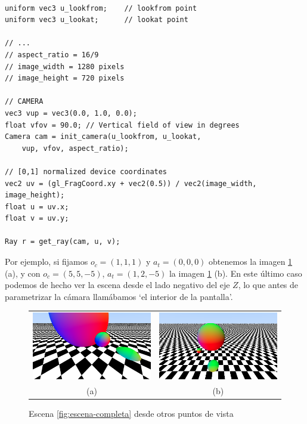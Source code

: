 \begin{lstlisting}

uniform vec3 u_lookfrom;    // lookfrom point
uniform vec3 u_lookat;      // lookat point

// ... 
// aspect_ratio = 16/9
// image_width = 1280 pixels
// image_height = 720 pixels

// CAMERA
vec3 vup = vec3(0.0, 1.0, 0.0);
float vfov = 90.0; // Vertical field of view in degrees
Camera cam = init_camera(u_lookfrom, u_lookat, 
    vup, vfov, aspect_ratio);

// [0,1] normalized device coordinates
vec2 uv = (gl_FragCoord.xy + vec2(0.5)) / vec2(image_width, image_height);
float u = uv.x;
float v = uv.y;

Ray r = get_ray(cam, u, v);
\end{lstlisting}

Por ejemplo, si fijamos $o_c = (1,1,1)$ y $a_t = (0,0,0)$ obtenemos la imagen \ref{fig:escena-camara} (a), y con $o_c=(5, 5, -5)$, $a_t=(1,2,-5)$ la imagen \ref{fig:escena-camara} (b). En este último caso podemos de hecho ver la escena desde el lado negativo del eje $Z$, lo que antes de parametrizar la cámara llamábamos `el interior de la pantalla'.

\begin{figure}[ht]
    \centering
    \begin{tabular}{cc}
          \includegraphics[scale=0.25]{img/C7/camera-1.png} &   \includegraphics[scale=0.25]{img/C7/camera-2.png} \\
    (a) & (b)\\[6pt]
    \end{tabular}
    \caption{Escena \ref{fig:escena-completa} desde otros puntos de vista}
    \label{fig:escena-camara}
\end{figure}

